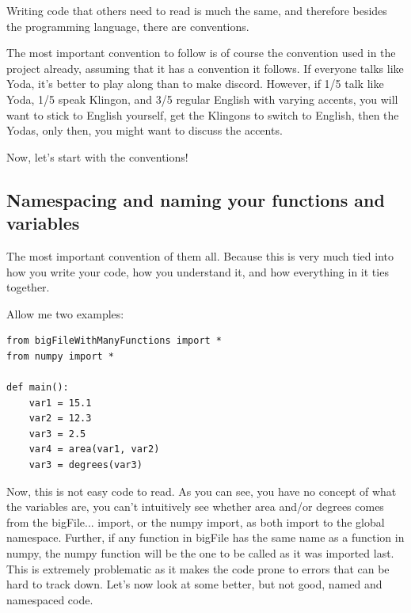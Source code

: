 \documentclass[10pt,a4paper]{article}
\begin{document}
Writing code that others need to read is much the same, and therefore besides the programming language, there are conventions. 

The most important convention to follow is of course the convention used in the project already, assuming that it has a convention it follows. If everyone talks like Yoda, it's better to play along than to make discord. However, if 1/5 talk like Yoda, 1/5 speak Klingon, and 3/5 regular English with varying accents, you will want to stick to English yourself, get the Klingons to switch to English, then the Yodas, only then, you might want to discuss the accents.

Now, let's start with the conventions!

\subsection{Namespacing and naming your functions and variables}

The most important convention of them all. Because this is very much tied into how you write your code, how you understand it, and how everything in it ties together.

Allow me two examples:
\begin{lstlisting}
from bigFileWithManyFunctions import *
from numpy import *

def main():
	var1 = 15.1
	var2 = 12.3
	var3 = 2.5
	var4 = area(var1, var2)
	var3 = degrees(var3)

\end{lstlisting}

Now, this is not easy code to read. As you can see, you have no concept of what the variables are, you can't intuitively see whether area and/or degrees comes from the bigFile... import, or the numpy import, as both import to the global namespace. Further, if any function in bigFile has the same name as a function in numpy, the numpy function will be the one to be called as it was imported last. This is extremely problematic as it makes the code prone to errors that can be hard to track down. Let's now look at some better, but not good, named and namespaced code.
\end{document}
